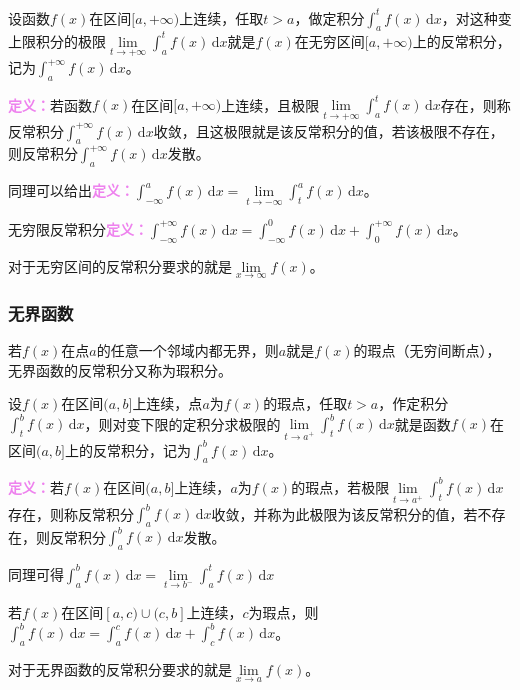 \documentclass[UTF8, 12pt]{ctexart}
\begin{document}
设函数$f(x)$在区间$[a,+\infty)$上连续，任取$t>a$，做定积分$\int_a^tf(x)\,\textrm{d}x$，对这种变上限积分的极限$\lim\limits_{t\to+\infty}\int_a^tf(x)\,\textrm{d}x$就是$f(x)$在无穷区间$[a,+\infty)$上的反常积分，记为$\int_a^{+\infty}f(x)\,\textrm{d}x$。

\textcolor{violet}{\textbf{定义：}}若函数$f(x)$在区间$[a,+\infty)$上连续，且极限$\lim\limits_{t\to+\infty}\int_a^tf(x)\,\textrm{d}x$存在，则称反常积分$\int_a^{+\infty}f(x)\,\textrm{d}x$收敛，且这极限就是该反常积分的值，若该极限不存在，则反常积分$\int_a^{+\infty}f(x)\,\textrm{d}x$发散。

同理可以给出\textcolor{violet}{\textbf{定义：}}$\int_{-\infty}^af(x)\,\textrm{d}x=\lim\limits_{t\to-\infty}\int_t^af(x)\,\textrm{d}x$。

无穷限反常积分\textcolor{violet}{\textbf{定义：}}$\int_{-\infty}^{+\infty}f(x)\,\textrm{d}x=\int_{-\infty}^0f(x)\,\textrm{d}x+\int_0^{+\infty}f(x)\,\textrm{d}x$。

对于无穷区间的反常积分要求的就是$\lim\limits_{x\to\infty}f(x)$。

\subsubsection{无界函数}

若$f(x)$在点$a$的任意一个邻域内都无界，则$a$就是$f(x)$的瑕点（无穷间断点），无界函数的反常积分又称为瑕积分。

设$f(x)$在区间$(a,b]$上连续，点$a$为$f(x)$的瑕点，任取$t>a$，作定积分$\int_t^bf(x)\,\textrm{d}x$，则对变下限的定积分求极限的$\lim\limits_{t\to a^+}\int_t^bf(x)\,\textrm{d}x$就是函数$f(x)$在区间$(a,b]$上的反常积分，记为$\int_a^bf(x)\,\textrm{d}x$。

\textcolor{violet}{\textbf{定义：}}若$f(x)$在区间$(a,b]$上连续，$a$为$f(x)$的瑕点，若极限$\lim\limits_{t\to a^+}\int_t^bf(x)\,\textrm{d}x$存在，则称反常积分$\int_a^bf(x)\,\textrm{d}x$收敛，并称为此极限为该反常积分的值，若不存在，则反常积分$\int_a^bf(x)\,\textrm{d}x$发散。

同理可得$\int_a^bf(x)\,\textrm{d}x=\lim\limits_{t\to b^-}\int_a^tf(x)\,\textrm{d}x$

若$f(x)$在区间$[a,c)\cup(c,b]$上连续，$c$为瑕点，则$\int_a^bf(x)\,\textrm{d}x=\int_a^cf(x)\,\textrm{d}x+\int_c^bf(x)\,\textrm{d}x$。

对于无界函数的反常积分要求的就是$\lim\limits_{x\to a}f(x)$。

\end{document}
